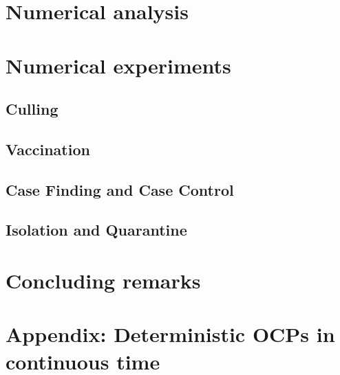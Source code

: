 \documentclass[titlepage]{amsart}
\begin{document}
  \section{Numerical analysis}
    
    
  \section{Numerical experiments}
    \subsection{Culling}
      
    \subsection{Vaccination}
      
    \subsection{Case Finding and Case Control}
      
    \subsection{Isolation and Quarantine}
      
%
%
  \section{Concluding remarks}
   
  \section{Appendix: Deterministic OCPs in continuous time}
    
%
%
  
  
\end{document}
